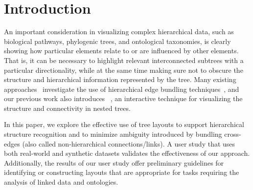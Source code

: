 \documentclass[a4paper]{llncs}
\begin{document}
\section{Introduction}
An important consideration in visualizing complex hierarchical data, such as biological pathways, phylogenic trees, and ontological taxonomies, is clearly showing how particular elements relate to or are influenced by other elements. That is, it can be necessary to highlight relevant interconnected subtrees with a particular directionality, while at the same time making sure not to obscure the structure and hierarchical information represented by the tree. Many existing approaches~\cite{Bach2016confluentgraphs,Holten2009StudyHEB,McGee2012StudyHEB} investigate the use of hierarchical edge bundling techniques~\cite{HierarchicalEdgeBundles2006}, and our previous work also introduces \theName{}~\cite{Dang2017CactusTrees}, an interactive technique for visualizing the structure and connectivity in nested trees. %


In this paper, we explore the effective use of tree layouts to support hierarchical structure recognition and to minimize ambiguity introduced by bundling cross-edges (also called non-hierarchical connections/links). A user study that uses both real-world and synthetic datasets validates the effectiveness of our approach. Additionally, the results of our user study offer preliminary guidelines for identifying or constructing layouts that are appropriate for tasks requiring the analysis of linked data and ontologies.
\end{document}
